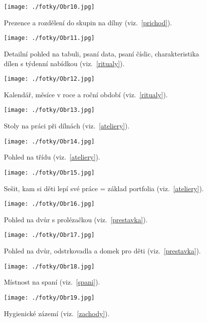 	\begin{figure}[tb]
		\centering
		\texttt{[image: ./fotky/Obr10.jpg]}
		\caption{
			Prezence a rozdělení do skupin na dílny (viz.~\ref{prichod}).
		}
		\label{Obr10}
	\end{figure}

	\begin{figure}[tb]
		\centering
		\texttt{[image: ./fotky/Obr11.jpg]}
		\caption{
			Detailní pohled na tabuli, psaní data, psaní číslic, charakteristika dílen s týdenní nabídkou  (viz.~\ref{ritualy}).
		}
		\label{Obr11}
	\end{figure}

	\begin{figure}[tb]
		\centering
		\texttt{[image: ./fotky/Obr12.jpg]}
		\caption{
			Kalendář, měsíce v roce a roční období (viz.~\ref{ritualy}).
		}
		\label{Obr12}
	\end{figure}

	\begin{figure}[tb]
		\centering
		\texttt{[image: ./fotky/Obr13.jpg]}
		\caption{
			Stoly na práci při dílnách (viz.~\ref{ateliery}).
		}
		\label{Obr13}
	\end{figure}
	\begin{figure}[tb]
		\centering
		\texttt{[image: ./fotky/Obr14.jpg]}
		\caption{
			Pohled na třídu (viz.~\ref{ateliery}).
		}
		\label{Obr14}
	\end{figure}

	\begin{figure}[tb]
		\centering
		\texttt{[image: ./fotky/Obr15.jpg]}
		\caption{
			Sešit, kam si děti lepí své práce = základ portfolia (viz.~\ref{ateliery}).
		}
		\label{Obr15}
	\end{figure}

	\begin{figure}[tb]
		\centering
		\texttt{[image: ./fotky/Obr16.jpg]}
		\caption{
			Pohled na dvůr s prolézačkou (viz.~\ref{prestavka}).
		}
		\label{Obr16}
	\end{figure}

	\begin{figure}[tb]
		\centering
		\texttt{[image: ./fotky/Obr17.jpg]}
		\caption{
			Pohled na dvůr, odstrkovadla a domek pro děti (viz.~\ref{prestavka}).
		}
		\label{Obr17}
	\end{figure}

	\begin{figure}[tb]
		\centering
		\texttt{[image: ./fotky/Obr18.jpg]}
		\caption{
			Místnost na spaní (viz.~\ref{spani}).
		}
		\label{Obr18}
	\end{figure}
	
	\begin{figure}[tb]
		\centering
		\texttt{[image: ./fotky/Obr19.jpg]}
		\caption{
			Hygienické zázemí (viz.~\ref{zachody}).
		}
		\label{Obr19}
	\end{figure}

